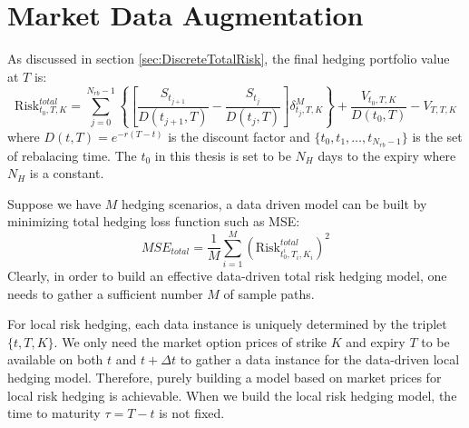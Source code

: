 \documentclass[letterpaper,12pt,titlepage,oneside,final]{book}
\numberwithin{equation}{section}
\theoremstyle{definition}
\newcommand{\Smkt}{S}
\begin{document}
\section{Market Data Augmentation}
\label{sec:DataAugmentation}
As discussed in section \ref{sec:DiscreteTotalRisk}, the final hedging portfolio value at $T$ is:
\begin{equation}
   \text{Risk}^{total}_{t_0,T,K}=\sum_{j=0}^{N_{rb}-1}\left\{ \left[\frac{\Smkt_{t_{j+1}}}{D(t_{j+1},T)}-\frac{\Smkt_{t_{j}}}{D(t_{j},T)}\right] \delta^M_{t_j,T,K} \right\}+\frac{V_{t_0,T,K}}{D(t_{0},T)}-V_{T,T,K}
\end{equation}
where
$D(t,T)=e^{-r(T-t)}$ is the discount factor and $\{t_0,t_1, \dots, t_{N_{rb}-1}\}$ is the set of rebalacing time. The $t_0$ in this thesis is set to be $N_H$ days to the expiry where $N_H$  is a constant. 

Suppose we have $M$ hedging scenarios, a data driven model can be built by minimizing total hedging loss function such as MSE:
\[
    MSE_{total}=\frac{1}{M}\sum_{i=1}^M  (\text{Risk}^{total}_{t^i_0,T_i,K_i})^2
\]
Clearly, in order to build an effective data-driven total risk hedging model, one needs to gather a sufficient  number $M$ of sample paths. 

For local risk hedging, each data instance is uniquely determined by the triplet $\{t,T,K\}$. We only need the market option prices of strike $K$ and expiry $T$ to be available on both $t$ and $t+\Delta t$ to gather a data instance for the data-driven local hedging model. Therefore, purely building a model based on market prices for local risk hedging is achievable. When we build the local risk hedging model, the time to maturity $\tau=T-t$ is not fixed.
\end{document}
